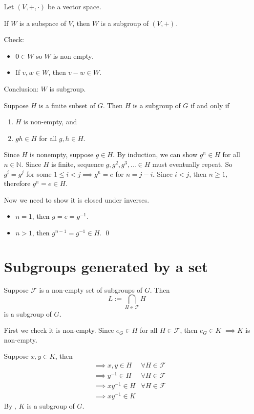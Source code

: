 \begin{ex}
Let $(V,+,\cdot)$ be a vector space.

If $W$ is a subspace of $V$, then $W$ is a subgroup of $(V,+)$.

Check: 
\begin{itemize}
	\item $0\in W$ so $W$ is non-empty. 
	\item If $v,w\in W$, then $v-w\in W$.
\end{itemize}
Conclusion: $W$ is subgroup.
\end{ex}

\begin{prop}
Suppose $H$ is a finite subset of $G$. Then $H$ is a subgroup of $G$ if and only if
\begin{enumerate}[label=(\alph*)]
\item $H$ is non-empty, and
\item $gh\in H$ for all $g,h\in H$. 
\end{enumerate}
\end{prop}


\begin{pfno}
Since $H$ is nonempty, suppose $g\in H$. By induction, we can show $g^n\in H$ for all $n\in \mathbb N$. Since $H$ is finite, sequence $g,g^2,g^3,\ldots\in H$ must eventually repeat. So $g^i=g^j$ for some $1\le i < j\implies g^n=e$ for $n=j-i$. Since $i<j$, then $n\ge 1$, therefore $g^n=e\in H$.

Now we need to show it is closed under inverses. 
\begin{itemize}
\item $n=1$, then $g=e=g^{-1}$.
\item $n>1$, then $g^{n-1}=g^{-1}\in H$. \qed
\end{itemize}
\end{pfno}

\section{Subgroups generated by a set}
\begin{prop}
Suppose $\mathcal F$ is a non-empty set of subgroups of $G$. Then 
$$L:=\bigcap_{H\in\mathcal F}H$$
is a subgroup of $G$.
\end{prop}

\begin{pf}
First we check it is non-empty. Since $e_G\in H$ for all $H\in\mathcal F$, then $e_G\in K$ $\implies K$ is non-empty.


Suppose $x,y\in K$, then 
$$
\begin{aligned}
&\implies x,y\in H & \forall H\in \mathcal F \\
& \implies y^{-1}\in H&\forall H\in \mathcal F \\
&\implies xy^{-1}\in H& \forall H\in\mathcal F\\ 
&\implies xy^{-1}\in K
\end{aligned}
$$
By , $K$ is a subgroup of $G$.
\end{pf}


